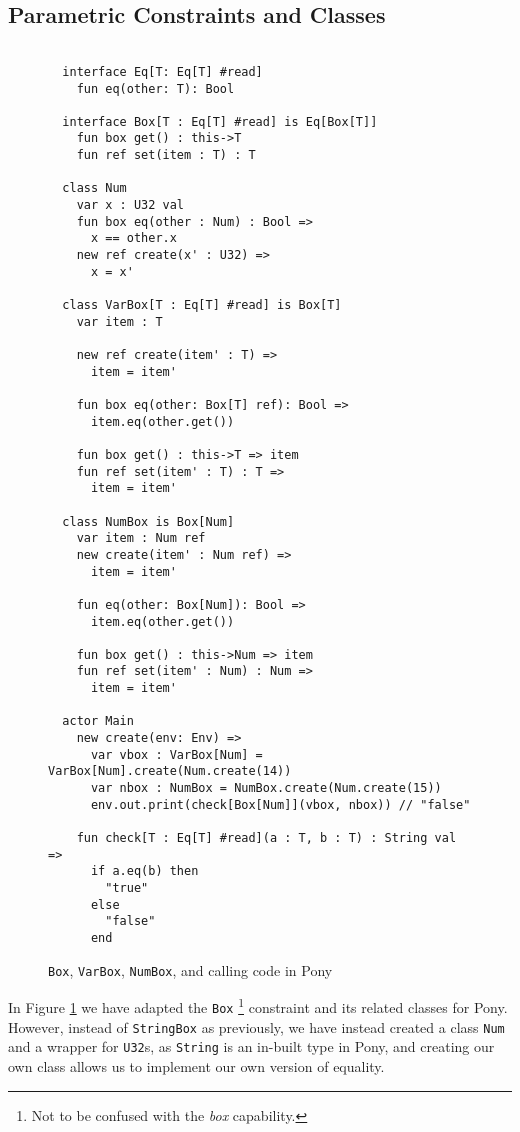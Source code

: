 \newpage

\subsection{Parametric Constraints and Classes}

\begin{figure}[H]
    \centering
    \begin{verbatim}
    
  interface Eq[T: Eq[T] #read]
    fun eq(other: T): Bool

  interface Box[T : Eq[T] #read] is Eq[Box[T]]
    fun box get() : this->T
    fun ref set(item : T) : T

  class Num
    var x : U32 val
    fun box eq(other : Num) : Bool =>
      x == other.x
    new ref create(x' : U32) =>
      x = x'
    
  class VarBox[T : Eq[T] #read] is Box[T]
    var item : T
  
    new ref create(item' : T) =>
      item = item'
  
    fun box eq(other: Box[T] ref): Bool =>
      item.eq(other.get())
    
    fun box get() : this->T => item
    fun ref set(item' : T) : T =>
      item = item'

  class NumBox is Box[Num]
    var item : Num ref
    new create(item' : Num ref) =>
      item = item'
  
    fun eq(other: Box[Num]): Bool =>
      item.eq(other.get())

    fun box get() : this->Num => item
    fun ref set(item' : Num) : Num =>
      item = item'

  actor Main
    new create(env: Env) =>
      var vbox : VarBox[Num] = VarBox[Num].create(Num.create(14))
      var nbox : NumBox = NumBox.create(Num.create(15))
      env.out.print(check[Box[Num]](vbox, nbox)) // "false"
      
    fun check[T : Eq[T] #read](a : T, b : T) : String val =>
      if a.eq(b) then 
        "true"
      else 
        "false"
      end
    \end{verbatim} 
    \caption{\texttt{Box}, \texttt{VarBox}, \texttt{NumBox}, and calling code in Pony}
    \label{fig:pony-varbox}
\end{figure}

In Figure \ref{fig:pony-varbox} we have adapted the \texttt{Box} \footnote{Not to be confused with the \textit{box} capability.} constraint and its related classes for Pony. However, instead of \texttt{StringBox} as previously, we have instead created a class \texttt{Num} and a wrapper for \texttt{U32}s, as \texttt{String} is an in-built type in Pony, and creating our own class allows us to implement our own version of equality. \\

